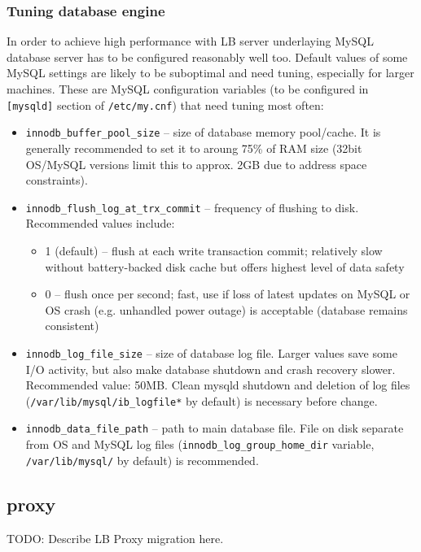 \subsubsection{Tuning database engine}
\label{inst:db_tuning}

In order to achieve high performance with LB server underlaying MySQL 
database server has to be configured reasonably well too. 
Default values of some MySQL settings are likely to be suboptimal
and need tuning, especially for larger machines.
These are MySQL configuration variables (to be configured in \texttt{[mysqld]} 
section of \texttt{/etc/my.cnf}) that need tuning most often:
\begin{itemize}
\item \texttt{innodb\_buffer\_pool\_size} -- size of database memory pool/cache. 
It is generally recommended to set it to aroung 75\% of RAM size
(32bit OS/MySQL versions limit this to approx. 2GB due to address space 
constraints).

\item \texttt{innodb\_flush\_log\_at\_trx\_commit} -- frequency of flushing to disk.
Recommended values include:
\begin{itemize}
\item 1 (default) -- flush at each write transaction commit; relatively
slow without battery-backed disk cache but offers highest level of data safety
\item 0 -- flush once per second; fast, use if loss of latest updates on MySQL
or OS crash (e.g. unhandled power outage) is acceptable (database remains consistent)
\end{itemize}

\item \texttt{innodb\_log\_file\_size} -- size of database log file. Larger values
save some I/O activity, but also make database shutdown and crash recovery slower.
Recommended value: 50MB. Clean mysqld shutdown and deletion of log files 
(\texttt{/var/lib/mysql/ib\_logfile*} by default) is necessary before change.

\item \texttt{innodb\_data\_file\_path} -- path to main database file. File on
disk separate from OS and MySQL log files (\texttt{innodb\_log\_group\_home\_dir} variable,
\texttt{/var/lib/mysql/} by default) is recommended.

\end{itemize}

\subsection{\LB proxy}
\label{inst:LBproxy}
TODO: Describe LB Proxy migration here.


